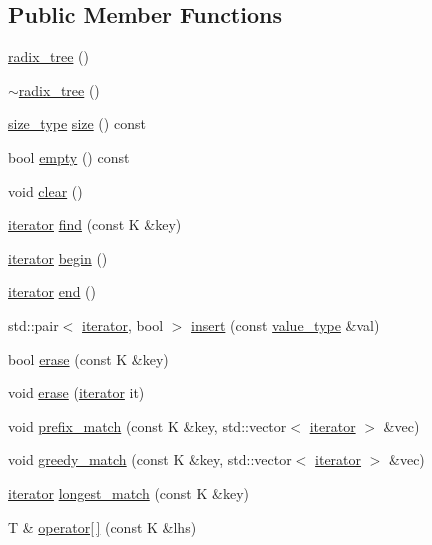 \subsection*{Public Member Functions}
\begin{DoxyCompactItemize}
\item 
\hyperlink{classradix__tree_af48f519c2190b3ca6762a2d8d4bb0fb8}{radix\+\_\+tree} ()
\item 
\hyperlink{classradix__tree_a2bb7871a53afe5f826b3ab77fe039075}{$\sim$radix\+\_\+tree} ()
\item 
\hyperlink{classradix__tree_a67d23e7c48875261141f6259ade40749}{size\+\_\+type} \hyperlink{classradix__tree_aaf72ee1826a0ace064ed5f1d62f10aff}{size} () const 
\item 
bool \hyperlink{classradix__tree_ad4cdb29807c357f41ead6a4da8fd0666}{empty} () const 
\item 
void \hyperlink{classradix__tree_a6c1152cdbae47781da0f9939f32760c4}{clear} ()
\item 
\hyperlink{classradix__tree_a820fe40af6049993760c529e918c5575}{iterator} \hyperlink{classradix__tree_ac81a340d1ba443a074dfcb6cd94e10ae}{find} (const K \&key)
\item 
\hyperlink{classradix__tree_a820fe40af6049993760c529e918c5575}{iterator} \hyperlink{classradix__tree_a21d97262afed8dc8bed0d1f1059a9c5e}{begin} ()
\item 
\hyperlink{classradix__tree_a820fe40af6049993760c529e918c5575}{iterator} \hyperlink{classradix__tree_ae4f5d38cb6294fbf194eea9083fb653c}{end} ()
\item 
std\+::pair$<$ \hyperlink{classradix__tree_a820fe40af6049993760c529e918c5575}{iterator}, bool $>$ \hyperlink{classradix__tree_a6f13485d5e3091ba26fe0b51cfd49f0a}{insert} (const \hyperlink{classradix__tree_a6053e1b2ccac54f990d6377a1797ebc8}{value\+\_\+type} \&val)
\item 
bool \hyperlink{classradix__tree_a0cb893a83d6178476627810ae753a0a2}{erase} (const K \&key)
\item 
void \hyperlink{classradix__tree_a6214bf995a2f7cc3a8bd2be38bc381eb}{erase} (\hyperlink{classradix__tree_a820fe40af6049993760c529e918c5575}{iterator} it)
\item 
void \hyperlink{classradix__tree_a819af474517e7398ba61c0f72e4fa545}{prefix\+\_\+match} (const K \&key, std\+::vector$<$ \hyperlink{classradix__tree_a820fe40af6049993760c529e918c5575}{iterator} $>$ \&vec)
\item 
void \hyperlink{classradix__tree_a7fb4e244818ad60f4bbf936533ba18e1}{greedy\+\_\+match} (const K \&key, std\+::vector$<$ \hyperlink{classradix__tree_a820fe40af6049993760c529e918c5575}{iterator} $>$ \&vec)
\item 
\hyperlink{classradix__tree_a820fe40af6049993760c529e918c5575}{iterator} \hyperlink{classradix__tree_a65818f8ce51e27448a8afd47971e984e}{longest\+\_\+match} (const K \&key)
\item 
T \& \hyperlink{classradix__tree_ae66624c974244381c917486275b47738}{operator\mbox{[}$\,$\mbox{]}} (const K \&lhs)
\end{DoxyCompactItemize}


